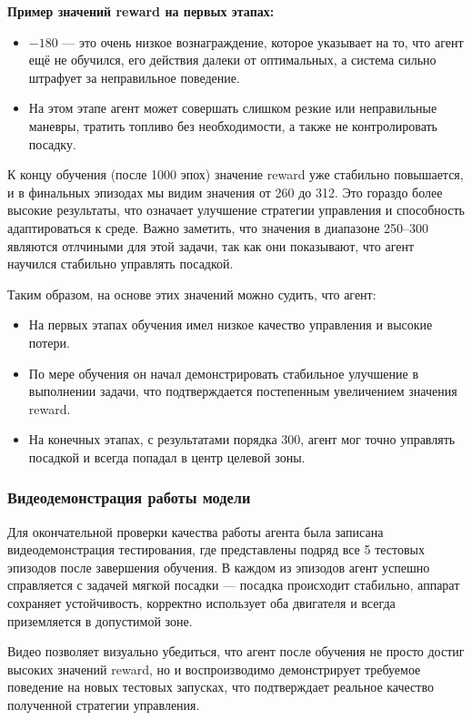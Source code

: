 \documentclass[a4paper,12pt]{article}
\begin{document}
\textbf{Пример значений reward на первых этапах:}
\begin{itemize}
	\item $-180$ --- это очень низкое вознаграждение, которое указывает на то, что агент ещё не обучился, его действия далеки от оптимальных, а система сильно штрафует за неправильное поведение.
	\item На этом этапе агент может совершать слишком резкие или неправильные маневры, тратить топливо без необходимости, а также не контролировать посадку.
\end{itemize}

К концу обучения (после 1000 эпох) значение reward уже стабильно повышается, и в финальных эпизодах мы видим значения от 260 до 312. Это гораздо более высокие результаты, что означает улучшение стратегии управления и способность адаптироваться к среде. Важно заметить, что значения в диапазоне 250--300 являются отлчиными для этой задачи, так как они показывают, что агент научился стабильно управлять посадкой.

Таким образом, на основе этих значений можно судить, что агент:
\begin{itemize}
	\item На первых этапах обучения имел низкое качество управления и высокие потери.
	\item По мере обучения он начал демонстрировать стабильное улучшение в выполнении задачи, что подтверждается постепенным увеличением значения reward.
	\item На конечных этапах, с результатами порядка 300, агент мог точно управлять посадкой и всегда попадал в центр целевой зоны.
\end{itemize}

\subsubsection{Видеодемонстрация работы модели}

Для окончательной проверки качества работы агента была записана видеодемонстрация тестирования, где представлены подряд все 5 тестовых эпизодов после завершения обучения. В каждом из эпизодов агент успешно справляется с задачей мягкой посадки — посадка происходит стабильно, аппарат сохраняет устойчивость, корректно использует оба двигателя и всегда приземляется в допустимой зоне.

Видео позволяет визуально убедиться, что агент после обучения не просто достиг высоких значений reward, но и воспроизводимо демонстрирует требуемое поведение на новых тестовых запусках, что подтверждает реальное качество полученной стратегии управления.
\end{document}
